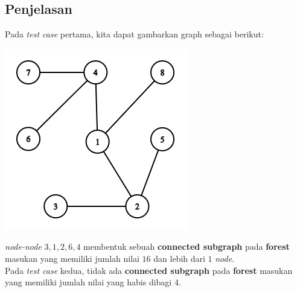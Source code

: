 \documentclass{article}
\begin{document}
\subsection*{Penjelasan}
Pada \textit{test case} pertama, kita dapat gambarkan graph sebagai berikut:
\begin{center}
\includegraphics[scale=0.5]{tc1.png}
\end{center}
\textit{node-node} ${3,1,2,6,4}$ membentuk sebuah \textbf{connected subgraph} pada \textbf{forest} masukan yang memiliki jumlah nilai $16$ dan lebih dari $1$ \textit{node}. \\

Pada \textit{test case} kedua, tidak ada \textbf{connected subgraph} pada \textbf{forest} masukan yang memiliki jumlah nilai yang habis dibagi 4.
\end{document}
